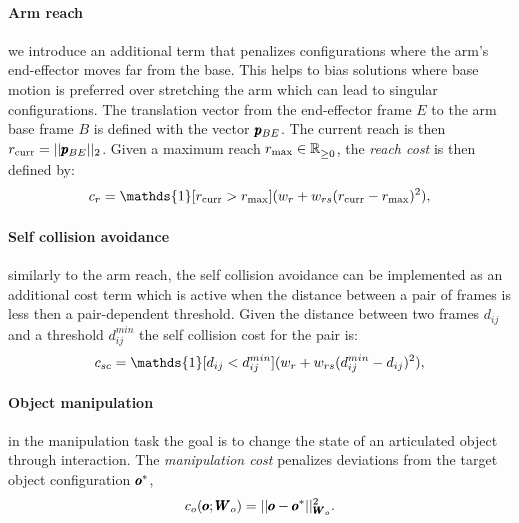  \paragraph{Arm reach} we introduce an additional term that penalizes configurations where the arm's end-effector moves far from the base. This helps to bias solutions where base motion is preferred over stretching the arm which can lead to singular configurations. The translation vector from the end-effector frame $E$ to the arm base frame $B$ is defined with the vector $\pmb{p}_{BE}$. The current reach is then $r_{\text{curr}} = || \pmb{p}_{BE} ||_2$. Given a maximum reach $r_{\text{max}} \in \mathbb{R}^{}_{\geq 0}$, the \textit{reach cost} is then defined by:
 \begin{equation}
   c_r = \mathds{1}[r_{\text{curr}} > r_{\text{max}}] (\weightScalar{r} + \weightScalar{rs}(r_{\text{curr}} - r_{\text{max}})^2),    
 \end{equation}

 \paragraph{Self collision avoidance} similarly to the arm reach, the self collision avoidance can be implemented as an additional cost term which is active when the distance between a pair of frames is less then a pair-dependent threshold. Given the distance between two frames $d_{ij}$ and a threshold $d^{min}_{ij}$ the self collision cost for the pair is:
 \begin{equation}
   c_{sc} = \mathds{1}[d_{ij} < d^{min}_{ij}] (\weightScalar{r} + \weightScalar{rs}(d^{min}_{ij} - d_{ij})^2),    
 \end{equation}
 
 \paragraph{Object manipulation} in the manipulation task the goal is to change the state of an articulated object through interaction. The \textit{manipulation cost} penalizes deviations from the target object configuration $\pmb{o}^{*}$,
\begin{equation}
    c_o(\pmb{o}; \pmb{W}_{o}) = || \pmb{o} - \pmb{o}^{*}||^2_{\pmb{W}_{o}}.
\end{equation}
